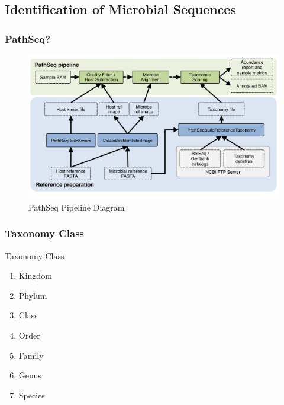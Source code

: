 \documentclass{beamer}
\begin{document}
    \subsection{Identification of Microbial Sequences}
    \begin{frame}
        \frametitle{PathSeq?}

        \begin{figure}
            \includegraphics[width=0.8 \linewidth]{figures/Workflow/PathSeq.png}
            \caption{PathSeq Pipeline Diagram \protect\cite{pathseq1, pathseq2}}
        \end{figure}
    \end{frame}

    \begin{frame}
        \frametitle{Taxonomy Class}

        \begin{block}{Taxonomy Class}
            \begin{enumerate}
                \item Kingdom
                \item Phylum
                \item Class
                \item Order
                \item Family
                \item Genus
                \item Species
            \end{enumerate}
        \end{block}
    \end{frame}
\end{document}
